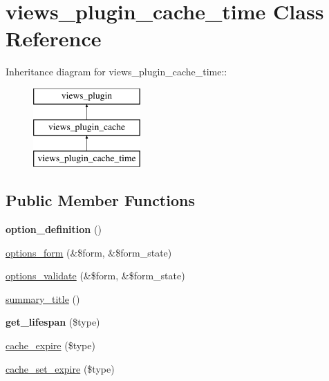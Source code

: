 \hypertarget{classviews__plugin__cache__time}{
\section{views\_\-plugin\_\-cache\_\-time Class Reference}
\label{classviews__plugin__cache__time}
}
Inheritance diagram for views\_\-plugin\_\-cache\_\-time::\begin{figure}[H]
\begin{center}
\leavevmode
\includegraphics[height=3cm]{classviews__plugin__cache__time}
\end{center}
\end{figure}
\subsection*{Public Member Functions}
\begin{DoxyCompactItemize}
\item 
\hypertarget{classviews__plugin__cache__time_ab60fe2bdb412af2049d9d9a9c025d725}{
{\bfseries option\_\-definition} ()}
\label{classviews__plugin__cache__time_ab60fe2bdb412af2049d9d9a9c025d725}

\item 
\hyperlink{classviews__plugin__cache__time_ac12d2ba054e232ae1d425d189a2d78d9}{options\_\-form} (\&\$form, \&\$form\_\-state)
\item 
\hyperlink{classviews__plugin__cache__time_a095bb0d313db8eef7521928923a6f261}{options\_\-validate} (\&\$form, \&\$form\_\-state)
\item 
\hyperlink{classviews__plugin__cache__time_ac8eaac0cd0c620c7583dbbe0481ca62c}{summary\_\-title} ()
\item 
\hypertarget{classviews__plugin__cache__time_a0034ec4c1b2f63c37d339430f7522b22}{
{\bfseries get\_\-lifespan} (\$type)}
\label{classviews__plugin__cache__time_a0034ec4c1b2f63c37d339430f7522b22}

\item 
\hyperlink{classviews__plugin__cache__time_a6e04720a6807812cfb5840ea7b49baaa}{cache\_\-expire} (\$type)
\item 
\hyperlink{classviews__plugin__cache__time_ab816b7a602e3225387b41c0e7950a54c}{cache\_\-set\_\-expire} (\$type)
\end{DoxyCompactItemize}


